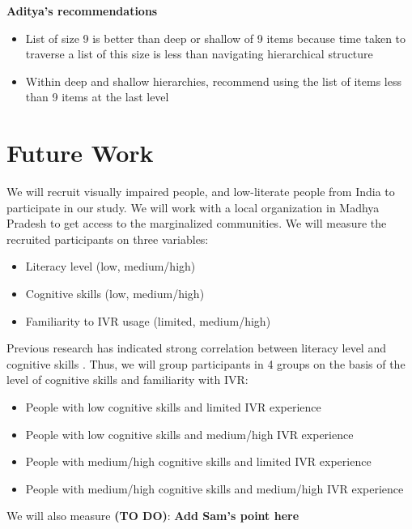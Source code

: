 \documentclass{sigchi}
\begin{document}
\textbf{Aditya's recommendations}
\begin{itemize}
\item List of size 9 is better than deep or shallow of 9 items because time taken to traverse a list of this size is less than navigating hierarchical structure
\item Within deep and shallow hierarchies, recommend using the list of items less than 9 items at the last level 
\end{itemize}



\section{Future Work}
We will recruit visually impaired people, and low-literate people from India to participate in our study. We will work with a local organization in Madhya Pradesh to get access to the marginalized communities. We will measure the recruited participants on three variables:
\begin{itemize}
\item Literacy level (low, medium/high)
\item Cognitive skills (low, medium/high)
\item Familiarity to IVR usage (limited, medium/high)
\end{itemize}

Previous research has indicated strong correlation between literacy level and cognitive skills \cite{Reis2001,Medhi2013a}. Thus, we will group participants in 4 groups on the basis of the level of cognitive skills and familiarity with IVR:

\begin{itemize}
\item People with low cognitive skills and limited IVR experience
\item People with low cognitive skills and medium/high IVR experience
\item People with medium/high cognitive skills and limited IVR experience
\item People with medium/high cognitive skills and medium/high IVR experience
\end{itemize}

We will also measure \textbf{(TO DO)}:  \textbf{Add Sam's point here}
\end{document}
